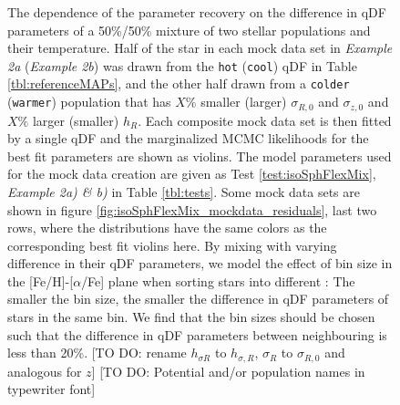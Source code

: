 \addtocounter{figure}{-1}
\begin{figure} [t!]
\caption{The dependence of the parameter recovery on the difference in qDF parameters of a 50\%/50\% mixture of two stellar populations and their temperature. Half of the star in each mock data set in \emph{Example 2a} (\emph{Example 2b}) was drawn from the \texttt{hot} (\texttt{cool}) qDF in Table \ref{tbl:referenceMAPs}, and the other half drawn from a \texttt{colder} (\texttt{warmer}) population that has $X\%$ smaller (larger) $\sigma_{R,0}$ and $\sigma_{z,0}$ and $X\%$ larger (smaller) $h_R$. Each composite mock data set is then fitted by a single qDF and the marginalized MCMC likelihoods for the best fit parameters are shown as violins. The model parameters used for the mock data creation are given as Test \ref{test:isoSphFlexMix}, \emph{Example 2a) \& b)} in Table \ref{tbl:tests}. Some mock data sets are shown in figure \ref{fig:isoSphFlexMix_mockdata_residuals}, last two rows, where the distributions have the same colors as the corresponding best fit violins here. By mixing \MAPs{} with varying difference in their qDF parameters, we model the effect of bin size in the [Fe/H]-[$\alpha$/Fe] plane when sorting stars into different \MAPs{}: The smaller the bin size, the smaller the difference in qDF parameters of stars in the same bin. We find that the bin sizes should be chosen such that the difference in qDF parameters between neighbouring \MAPs{} is less than 20\%. [TO DO: rename $h_{\sigma R}$ to $h_{\sigma,R}$, $\sigma_R$ to $\sigma_{R,0}$ and analogous for $z$] [TO DO: Potential and/or population names in typewriter font]} 
\label{fig:isoSphFlexMixDiff}
\end{figure}

